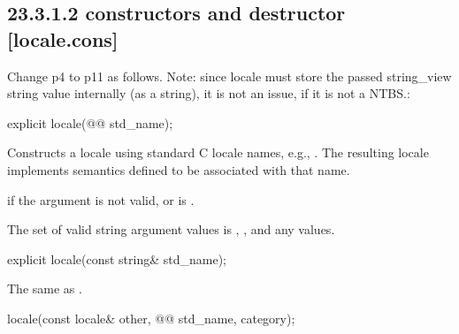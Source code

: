\documentclass[ebook,11pt,article]{memoir}
\begin{document}
\subsection{23.3.1.2  constructors and destructor [locale.cons]}
Change p4 to p11 as follows. Note: since locale must store the passed string_view string value internally (as a string), it is not an issue, if it is not a NTBS.:

\begin{itemdecl}
explicit locale(@@ std_name);
\end{itemdecl}

\begin{itemdescr}
\pnum
\effects
Constructs a locale using standard C locale names, e.g., .
The resulting locale implements semantics defined to be associated
with that name.

\pnum
\throws
{}
if the argument is not valid, or is .

\pnum
\remarks
The set of valid string argument values is , ,
and any  values.
\end{itemdescr}

\begin{removedblock}
\begin{itemdecl}
explicit locale(const string& std_name);
\end{itemdecl}

\begin{itemdescr}
\pnum
\effects The same as .
\end{itemdescr}
\end{removedblock}

\begin{itemdecl}
locale(const locale& other, @@ std_name, category);
\end{itemdecl}
\end{document}
